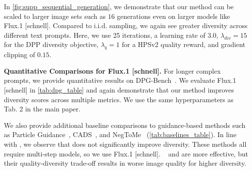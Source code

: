 \documentclass[10pt,twocolumn,letterpaper]{article}
\begin{document}
 In \cref{fig:supp_sequential_generation}, we demonstrate that our method can be scaled to larger image sets such as $16$ generations even on larger models like Flux.1 [schnell]. Compared to $\text{i.i.d.}$ sampling, we again see greater diversity across different text prompts. Here, we use 25 iterations, a learning rate of $3.0$, $\lambda_{div}=15$ for the DPP diversity objective, $\lambda_{q}=1$ for a HPSv2 quality reward, and gradient clipping of $0.15$. 

\noindent \textbf{Quantitative Comparisons for Flux.1 [schnell].} For longer complex prompts, we provide quantitative results on DPG-Bench~\cite{hu2024ella}. We evaluate Flux.1 [schnell] in \cref{tab:dpg_table} and again demonstrate that our method improves diversity scores across multiple metrics. We use the same hyperparameters as Tab. 2 in the main paper.

We also provide additional baseline comparisons to guidance-based methods such as Particle Guidance~\cite{particle}, CADS~\cite{sadat2023cads}, and NegToMe~\cite{singh2024negative} (\cref{tab:baselines_table}).
In line with \cite{gi}, we observe that \cite{particle} does not significantly improve diversity. These methods all require multi-step models, so we use Flux.1 [schnell]. ~\cite{sadat2023cads} and \cite{singh2024negative} are more effective, but their quality-diversity trade-off results in worse image quality for higher diversity.
\end{document}
